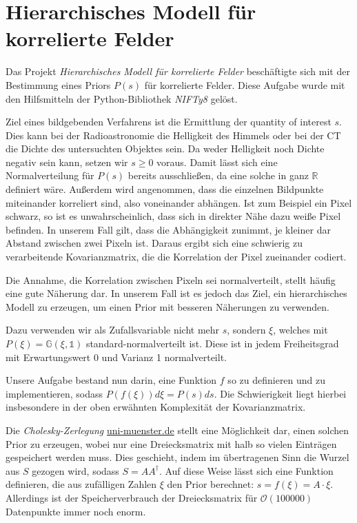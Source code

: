 \section{Hierarchisches Modell für korrelierte Felder}\label{k4.2.hiera}
Das Projekt \emph{Hierarchisches Modell für korrelierte Felder} beschäftigte sich mit der Bestimmung eines Priors $P(s)$ für korrelierte Felder. Diese Aufgabe wurde mit den Hilfsmitteln der Python-Bibliothek \emph{NIFTy8} gelöst.

Ziel eines bildgebenden Verfahrens ist die Ermittlung der quantity of interest $s$. Dies kann bei der Radioastronomie die Helligkeit des Himmels oder bei der CT die Dichte des untersuchten Objektes sein. Da weder Helligkeit noch Dichte negativ sein kann, setzen wir $s \geq 0$ voraus. Damit lässt sich eine Normalverteilung für $P(s)$ bereits ausschließen, da eine solche in ganz $\mathbb{R}$ definiert wäre. Außerdem wird angenommen, dass die einzelnen Bildpunkte miteinander korreliert sind, also voneinander abhängen. Ist zum Beispiel ein Pixel schwarz, so ist es unwahrscheinlich, dass sich in direkter Nähe dazu weiße Pixel befinden. In unserem Fall gilt, dass die Abhängigkeit zunimmt, je kleiner dar Abstand zwischen zwei Pixeln ist. Daraus ergibt sich eine schwierig zu verarbeitende Kovarianzmatrix, die die Korrelation der Pixel zueinander codiert.

Die Annahme, die Korrelation zwischen Pixeln sei normalverteilt, stellt häufig eine gute Näherung dar. In unserem Fall ist es jedoch das Ziel, ein hierarchisches Modell zu erzeugen, um einen Prior mit besseren Näherungen zu verwenden.

Dazu verwenden wir als Zufallsvariable nicht mehr $s$, sondern $\xi$, welches mit $P(\xi) = \mathbb{G}(\xi, \mathds{1})$ standard-normalverteilt ist. Diese ist in jedem Freiheitsgrad mit Erwartungswert 0 und Varianz 1 normalverteilt.

Unsere Aufgabe bestand nun darin, eine Funktion $f$ so zu definieren und zu implementieren, sodass $P(f(\xi)) d \xi = P(s) ds$. Die Schwierigkeit liegt hierbei insbesondere in der oben erwähnten Komplexität der Kovarianzmatrix.

Die \emph{Cholesky-Zerlegung} \href{https://www.uni-muenster.de/AMM/num/Vorlesungen/Numerik1_WS06/loesungen06/Prog_cholesky.pdf}{uni-muenster.de}
stellt eine Möglichkeit dar, einen solchen Prior zu erzeugen, wobei nur eine Dreiecksmatrix mit halb so vielen Einträgen gespeichert werden muss. Dies geschieht, indem im übertragenen Sinn die Wurzel aus $S$ gezogen wird, sodass $S=A A^{\dagger}$. Auf diese Weise lässt sich eine Funktion definieren, die aus zufälligen Zahlen $\xi$ den Prior berechnet: $s = f(\xi) = A \cdot \xi$. Allerdings ist der Speicherverbrauch der Dreiecksmatrix für $\mathcal{O}(100 000)$ Datenpunkte immer noch enorm.

